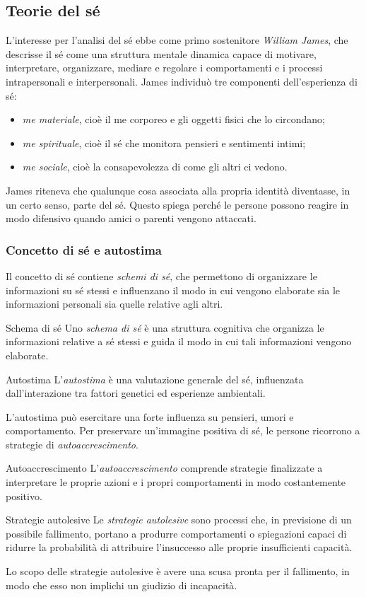 \documentclass[a4paper]{article}
\begin{document}
\subsection{Teorie del sé}
L'interesse per l'analisi del sé ebbe come primo sostenitore \emph{William James}, che descrisse il sé come una struttura mentale dinamica capace di motivare, interpretare, organizzare, mediare e regolare i comportamenti e i processi intrapersonali e interpersonali.
James individuò tre componenti dell'esperienza di sé:
\begin{itemize}
    \item \emph{me materiale}, cioè il me corporeo e gli oggetti fisici che lo circondano;
    \item \emph{me spirituale}, cioè il sé che monitora pensieri e sentimenti intimi;
    \item \emph{me sociale}, cioè la consapevolezza di come gli altri ci vedono.
\end{itemize}
James riteneva che qualunque cosa associata alla propria identità diventasse, in un certo senso, parte del sé. Questo spiega perché le persone possono reagire in modo difensivo quando amici o parenti vengono attaccati.
\subsubsection{Concetto di sé e autostima}
Il concetto di sé contiene \emph{schemi di sé}, che permettono di organizzare le informazioni su sé stessi e influenzano il modo in cui vengono elaborate sia le informazioni personali sia quelle relative agli altri.
\begin{snippetdefinition}{Schema di sé}
    Uno \emph{schema di sé} è una struttura cognitiva che organizza le informazioni relative a sé stessi e guida il modo in cui tali informazioni vengono elaborate.
\end{snippetdefinition}
\begin{snippetdefinition}{Autostima}
    L'\emph{autostima} è una valutazione generale del sé, influenzata dall'interazione tra fattori genetici ed esperienze ambientali.
\end{snippetdefinition}
L'autostima può esercitare una forte influenza su pensieri, umori e comportamento.
Per preservare un'immagine positiva di sé, le persone ricorrono a strategie di \emph{autoaccrescimento}.
\begin{snippetdefinition}{Autoaccrescimento}
    L'\emph{autoaccrescimento} comprende strategie finalizzate a interpretare le proprie azioni e i propri comportamenti in modo costantemente positivo.
\end{snippetdefinition}
\begin{snippetdefinition}{Strategie autolesive}
    Le \emph{strategie autolesive} sono processi che, in previsione di un possibile fallimento, portano a produrre comportamenti o spiegazioni capaci di ridurre la probabilità di attribuire l'insuccesso alle proprie insufficienti capacità.
\end{snippetdefinition}
Lo scopo delle strategie autolesive è avere una scusa pronta per il fallimento, in modo che esso non implichi un giudizio di incapacità.
\end{document}
